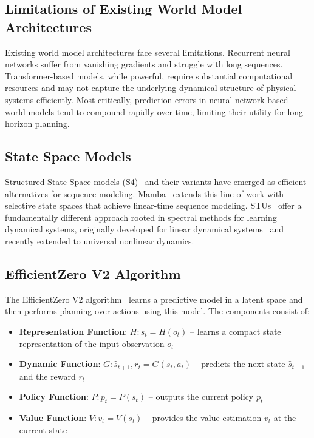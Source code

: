 \documentclass[10pt,twocolumn]{IEEEtran}
\begin{document}
\subsection{Limitations of Existing World Model Architectures}

Existing world model architectures face several limitations. Recurrent neural networks suffer from vanishing gradients and struggle with long sequences. Transformer-based models, while powerful, require substantial computational resources and may not capture the underlying dynamical structure of physical systems efficiently. Most critically, prediction errors in neural network-based world models tend to compound rapidly over time, limiting their utility for long-horizon planning.

\subsection{State Space Models}

Structured State Space models (S4)~\cite{gu2022efficiently} and their variants have emerged as efficient alternatives for sequence modeling. Mamba~\cite{gu2024mamba} extends this line of work with selective state spaces that achieve linear-time sequence modeling. STUs~\cite{agarwal2023spectral} offer a fundamentally different approach rooted in spectral methods for learning dynamical systems, originally developed for linear dynamical systems~\cite{hazan2017learning} and recently extended to universal nonlinear dynamics.

\subsection{EfficientZero V2 Algorithm}

The EfficientZero V2 algorithm~\cite{wang2024efficientzero} learns a predictive model in a latent space and then performs planning over actions using this model. The components consist of:

\begin{itemize}
    \item \textbf{Representation Function}: $H: s_t = H(o_t)$  --  learns a compact state representation of the input observation $o_t$
    \item \textbf{Dynamic Function}: $G: \hat{s}_{t+1}, r_t = G(s_t, a_t)$  --  predicts the next state $\hat{s}_{t+1}$ and the reward $r_t$
    \item \textbf{Policy Function}: $P: p_t = P(s_t)$  --  outputs the current policy $p_t$
    \item \textbf{Value Function}: $V: v_t = V(s_t)$  --  provides the value estimation $v_t$ at the current state
\end{itemize}
\end{document}
